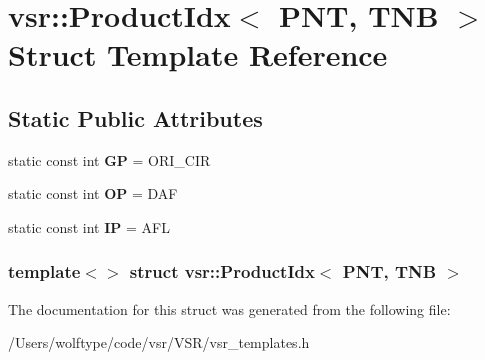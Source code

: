 \hypertarget{structvsr_1_1_product_idx_3_01_p_n_t_00_01_t_n_b_01_4}{\section{vsr\-:\-:Product\-Idx$<$ P\-N\-T, T\-N\-B $>$ Struct Template Reference}
\label{structvsr_1_1_product_idx_3_01_p_n_t_00_01_t_n_b_01_4}
}
\subsection*{Static Public Attributes}
\begin{DoxyCompactItemize}
\item 
\hypertarget{structvsr_1_1_product_idx_3_01_p_n_t_00_01_t_n_b_01_4_a2511e190d9ac668ee8b3371c60f02fa3}{static const int {\bfseries G\-P} = O\-R\-I\-\_\-\-C\-I\-R}\label{structvsr_1_1_product_idx_3_01_p_n_t_00_01_t_n_b_01_4_a2511e190d9ac668ee8b3371c60f02fa3}

\item 
\hypertarget{structvsr_1_1_product_idx_3_01_p_n_t_00_01_t_n_b_01_4_a4117a9e20981fce8a4677d18b26457cf}{static const int {\bfseries O\-P} = D\-A\-F}\label{structvsr_1_1_product_idx_3_01_p_n_t_00_01_t_n_b_01_4_a4117a9e20981fce8a4677d18b26457cf}

\item 
\hypertarget{structvsr_1_1_product_idx_3_01_p_n_t_00_01_t_n_b_01_4_ab4f986ce3447595b3b1587cb9e5091a7}{static const int {\bfseries I\-P} = A\-F\-L}\label{structvsr_1_1_product_idx_3_01_p_n_t_00_01_t_n_b_01_4_ab4f986ce3447595b3b1587cb9e5091a7}

\end{DoxyCompactItemize}
\subsubsection*{template$<$$>$ struct vsr\-::\-Product\-Idx$<$ P\-N\-T, T\-N\-B $>$}



The documentation for this struct was generated from the following file\-:\begin{DoxyCompactItemize}
\item 
/\-Users/wolftype/code/vsr/\-V\-S\-R/vsr\-\_\-templates.\-h\end{DoxyCompactItemize}
